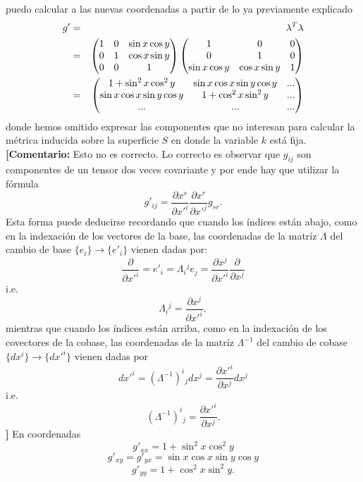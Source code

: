 \documentclass[11pt,spanish]{article}
\newcommand{\comentario}[1]{{\color{red} {\bf [Comentario:} #1 {\bf ]}}}
\begin{document}
puedo calcular a las nuevas coordenadas a partir de lo ya previamente explicado
\begin{eqnarray}
g'
&=&
\lambda^T
\lambda
\notag
\\
&=&
\begin{pmatrix}
1 & 0 & \sin x\cos y\\
0 & 1 & \cos x\sin y\\
0 & 0 & 1
\end{pmatrix}
\begin{pmatrix}
1 & 0 & 0\\
0 & 1 & 0\\
\sin x\cos y & \cos x\sin y & 1
\end{pmatrix}
\notag
\\
&=&
\begin{pmatrix}
1+\sin^2 x\cos^2 y & \sin x\cos x\sin y\cos y & ... \\
\sin x\cos x\sin y\cos y & 1+\cos^2 x\sin^2 y & ... \\
... & ... & ... 
\end{pmatrix}
\notag
\end{eqnarray}
donde hemos omitido expresar las componentes que no interesan para calcular la m\'etrica inducida sobre la superficie $S$ en donde la variable $k$ est\'a fija.
\comentario{Esto no es correcto. Lo correcto es observar que $g_{ij}$ son componentes de un tensor dos veces covariante y por ende hay que utilizar la f\'ormula
$$
g'_{ij}
=
\frac{\partial x^s}{\partial x'^i}
\frac{\partial x^r}{\partial x'^j}
g_{sr}
.
$$
Esta forma puede deducirse recordando que cuando los \'indices est\'an abajo, como en la indexaci\'on de los vectores de la base, las coordenadas de la matr\'iz $\Lambda$ del cambio de base $\{e_i\} \to \{e'_i\}$ vienen dadas por:
$$
\frac{\partial}{\partial x'^i}
=
e'_i 
=
\Lambda_i{}^j e_j
=
\frac{\partial x^j}{\partial x'^i}
\frac{\partial}{\partial x^j}
$$
i.e. 
$$ 
\Lambda_i{}^j
=
\frac{\partial x^j}{\partial x'^i},
$$
mientras que cuando los \'indices est\'an arriba, como en la indexaci\'on de los covectores de la cobase, las coordenadas de la matr\'iz $\Lambda^{-1}$ del cambio de cobase $\{dx^i\} \to \{dx'^i\}$ vienen dadas por
$$
dx'^i 
= 
(\Lambda^{-1})^i{}_j 
dx^j 
= 
\frac{\partial x'^i}{\partial x^j} 
dx^j
$$
i.e. 
$$ 
(\Lambda^{-1})^i{}_j 
= 
\frac{\partial x'^i}{\partial x^j} 
.
$$
}
En coordenadas
$$
g'_{xx}
=
1+\sin^2 x\cos^2 y
$$
$$
g'_{xy}
=
g'_{yx}
=
\sin x\cos x\sin y\cos y
$$
$$
g'_{yy}
=
1+\cos^2 x\sin^2 y
.
$$

\vspace{0.5cm}
\end{document}
